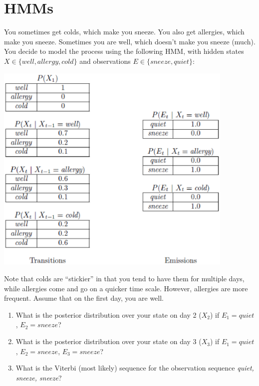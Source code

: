 \documentclass[12pt]{article}
\begin{document}
\clearpage

\section{HMMs}

You sometimes get colds, which make you sneeze. You also get
allergies, which make you sneeze. Sometimes you are well, which
doesn't make you sneeze (much). You decide to model the process using
the following HMM, with hidden states $X \in \{well, allergy, cold\}$ and
observations $E \in \{sneeze, quiet\}$:

\begin{center}
\includegraphics[height=4in]{sneeze.eps}
\end{center}

Note that colds are ``stickier'' in that you tend to have them for
multiple days, while allergies come and go on a quicker time
scale. However, allergies are more frequent. Assume that on the first
day, you are well.

\begin{enumerate}

\item What is the posterior distribution over your state on day 2
  ($X_2$) if $E_1 = quiet$, $E_2 = sneeze$?

\item What is the posterior distribution over your state on day 3
  ($X_3$) if $E_1 = quiet$, $E_2 = sneeze$, $E_3 = sneeze$?

\item What is the Viterbi (most likely) sequence for the observation
  sequence {\it quiet, sneeze, sneeze}?

\end{enumerate}
\end{document}
